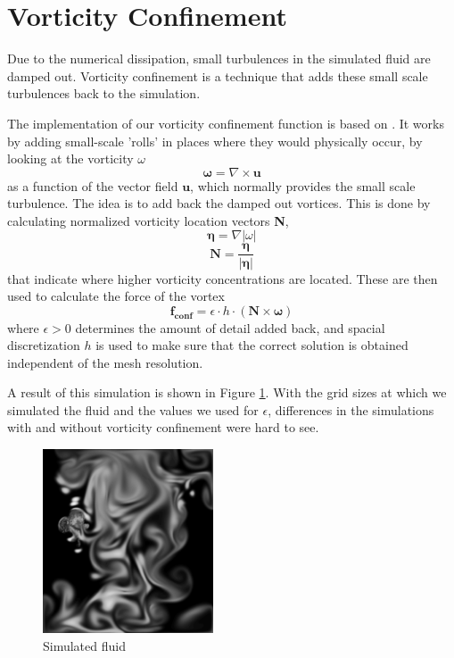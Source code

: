 \documentclass[a4paper,twoside,11pt,twocolumn]{article}
\begin{document}
\section{Vorticity Confinement}
Due to the numerical dissipation, small turbulences in the simulated fluid are damped out. Vorticity confinement is a technique that adds these small scale turbulences back to the simulation.
 
The implementation of our vorticity confinement function is based on \cite{fedkiw}. It works by adding small-scale 'rolls' in places where they would physically occur, by looking at the vorticity $\omega$ \[ \mathbf{\omega} = \nabla \times \mathbf{u} \] as a function of the vector field $\mathbf{u}$, which normally provides the small scale turbulence. The idea is to add back the damped out vortices. This is done by calculating normalized vorticity location vectors \textbf{N},  \[\mathbf{\eta} = \nabla|\omega| \]\[ \mathbf{N} = \frac{\mathbf{\eta}}{|\mathbf{\eta}|} \] that indicate where higher vorticity concentrations are located. These are then used to calculate the force of the vortex \[ \mathbf{f_{conf}} = \epsilon\cdot h\cdot(\mathbf{N} \times \mathbf{\omega}) \] where $\epsilon > 0$ determines the amount of detail added back, and spacial discretization $h$ is used to make sure that the correct solution is obtained independent of the mesh resolution.

A result of this simulation is shown in Figure \ref{fig:fluid}. With the grid sizes at which we simulated the fluid and the values we used for $\epsilon$, differences in the simulations with and without vorticity confinement were hard to see.

\begin{figure}[H]
	\centering
	\includegraphics[width=0.45\textwidth]{Fluid}
	\caption{Simulated fluid}
	\label{fig:fluid}
\end{figure}
\end{document}
